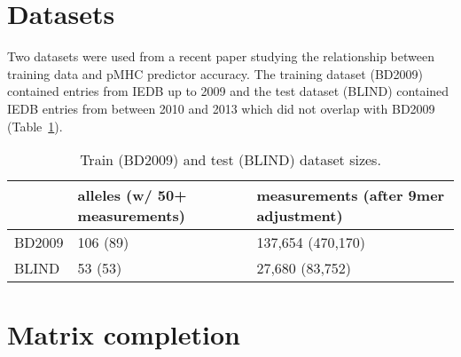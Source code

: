 \section*{Datasets}

Two datasets were used from a recent paper studying the relationship between training data and pMHC predictor accuracy\cite{Kim_2014}. The training dataset (BD2009) contained entries from IEDB\cite{Salimi_2012} up to 2009 and the test dataset (BLIND) contained IEDB entries from between 2010 and 2013 which did not overlap with BD2009 (Table~\ref{tab:datasets}).

\begin{table}
\label{tab:datasets}
\begin{tabular}{lll}
\toprule
{} & alleles (w/ 50+ measurements) & measurements (after 9mer adjustment) \\
\midrule
BD2009 &                      106 (89) &                      137,654 (470,170) \\
BLIND  &                       53 (53) &                        27,680 (83,752) \\
\bottomrule
\end{tabular}
\caption{Train (BD2009) and test (BLIND) dataset sizes.}
\end{table}



\section*{Matrix completion}

